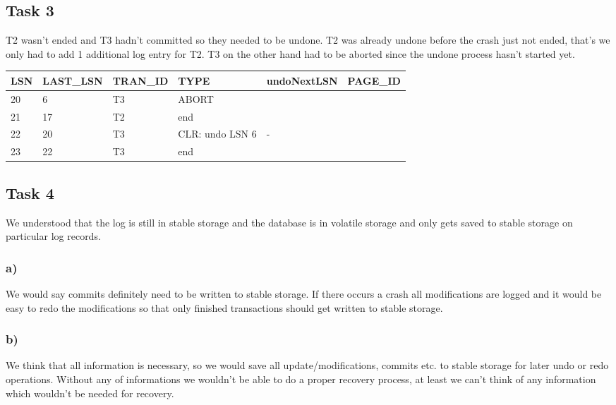 \documentclass[12pt,a4paper]{article}
\begin{document}
\subsection{Task 3}
T2 wasn't ended and T3 hadn't committed so they needed to be undone.
T2 was already undone before the crash just not ended, that's we only had to add 1 additional log entry for T2.
T3 on the other hand had to be aborted since the undone process hasn't started yet.

\begin{table}[!htbp]
    \centering
    \begin{tabularx}{\textwidth}{l|l|l|l|l|l}
        \hline
        LSN & LAST\_LSN & TRAN\_ID & TYPE & undoNextLSN & PAGE\_ID \\ 
        \hline
        20 & 6  & T3 & ABORT & & \\
        21 & 17 & T2 & end & & \\
        22 & 20 & T3 & CLR: undo LSN 6 & - & \\  
      	23 & 22 & T3 & end & & \\ 
        \hline
    \end{tabularx}
\end{table}

\subsection{Task 4}
We understood that the log is still in stable storage and the database is in volatile storage and only gets saved to stable storage on particular log records.
\subsubsection{a)}
We would say commits definitely need to be written to stable storage. If there occurs a crash all modifications are logged and it would be easy to redo the modifications so that only finished transactions should get written to stable storage.

\subsubsection{b)}
We think that all information is necessary, so we would save all update/modifications, commits etc. to stable storage for later undo or redo operations.
Without any of informations we wouldn't be able to do a proper recovery process, at least we can't think of any information which wouldn't be needed for recovery.
\end{document}
